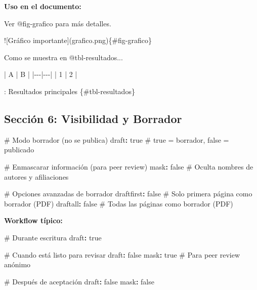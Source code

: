 \documentclass[
  doc,
  floatsintext,
  longtable,
  a4paper,
  nolmodern,
  notxfonts,
  notimes,
  12pt,
  colorlinks=true,linkcolor=blue,citecolor=blue,urlcolor=blue]{apa7}
\newenvironment{Shaded}{\begin{snugshade}}{\end{snugshade}}
\newcommand{\AlertTok}[1]{\textcolor[rgb]{0.68,0.00,0.00}{#1}}
\newcommand{\AttributeTok}[1]{\textcolor[rgb]{0.40,0.45,0.13}{#1}}
\newcommand{\CharTok}[1]{\textcolor[rgb]{0.13,0.47,0.30}{#1}}
\newcommand{\CommentTok}[1]{\textcolor[rgb]{0.37,0.37,0.37}{#1}}
\newcommand{\FunctionTok}[1]{\textcolor[rgb]{0.28,0.35,0.67}{#1}}
\newcommand{\KeywordTok}[1]{\textcolor[rgb]{0.00,0.23,0.31}{\textbf{#1}}}
\newcommand{\NormalTok}[1]{\textcolor[rgb]{0.00,0.23,0.31}{#1}}
\newcommand{\PreprocessorTok}[1]{\textcolor[rgb]{0.68,0.00,0.00}{#1}}
\begin{document}
\textbf{Uso en el documento:}

\begin{Shaded}
\begin{Highlighting}[]
\NormalTok{Ver @fig{-}grafico para más detalles.}

\AlertTok{![Gráfico importante](grafico.png)}\NormalTok{\{\#fig{-}grafico\}}

\NormalTok{Como se muestra en @tbl{-}resultados...}

\PreprocessorTok{|}\NormalTok{ A }\PreprocessorTok{|}\NormalTok{ B }\PreprocessorTok{|}
\PreprocessorTok{|{-}{-}{-}|{-}{-}{-}|}
\PreprocessorTok{|}\NormalTok{ 1 }\PreprocessorTok{|}\NormalTok{ 2 }\PreprocessorTok{|}

\NormalTok{: Resultados principales \{\#tbl{-}resultados\}}
\end{Highlighting}
\end{Shaded}

\subsection{Sección 6: Visibilidad y
Borrador}\label{secciuxf3n-6-visibilidad-y-borrador}

\begin{Shaded}
\begin{Highlighting}[]
\CommentTok{\# Modo borrador (no se publica)}
\FunctionTok{draft}\KeywordTok{:}\AttributeTok{ }\CharTok{true}\CommentTok{                  \# true = borrador, false = publicado}

\CommentTok{\# Enmascarar información (para peer review)}
\FunctionTok{mask}\KeywordTok{:}\AttributeTok{ }\CharTok{false}\CommentTok{                  \# Oculta nombres de autores y afiliaciones}

\CommentTok{\# Opciones avanzadas de borrador}
\FunctionTok{draftfirst}\KeywordTok{:}\AttributeTok{ }\CharTok{false}\CommentTok{            \# Solo primera página como borrador (PDF)}
\FunctionTok{draftall}\KeywordTok{:}\AttributeTok{ }\CharTok{false}\CommentTok{              \# Todas las páginas como borrador (PDF)}
\end{Highlighting}
\end{Shaded}

\textbf{Workflow típico:}

\begin{Shaded}
\begin{Highlighting}[]
\CommentTok{\# Durante escritura}
\FunctionTok{draft}\KeywordTok{:}\AttributeTok{ }\CharTok{true}

\CommentTok{\# Cuando está listo para revisar}
\FunctionTok{draft}\KeywordTok{:}\AttributeTok{ }\CharTok{false}
\FunctionTok{mask}\KeywordTok{:}\AttributeTok{ }\CharTok{true}\CommentTok{                   \# Para peer review anónimo}

\CommentTok{\# Después de aceptación}
\FunctionTok{draft}\KeywordTok{:}\AttributeTok{ }\CharTok{false}
\FunctionTok{mask}\KeywordTok{:}\AttributeTok{ }\CharTok{false}
\end{Highlighting}
\end{Shaded}
\end{document}
